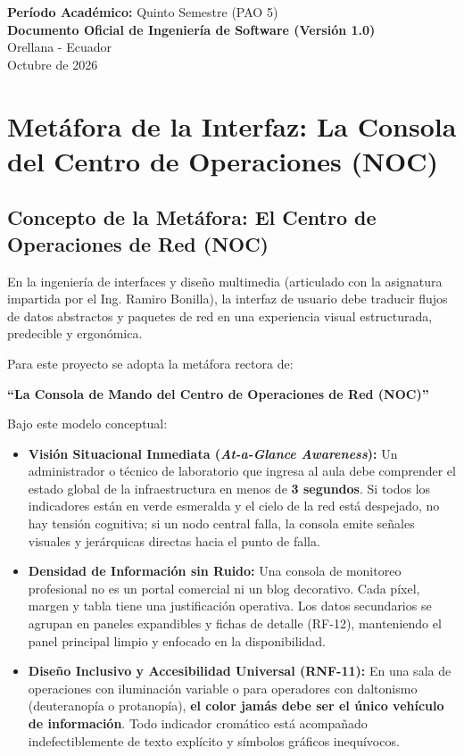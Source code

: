 \documentclass[12pt,a4paper]{report}
\begin{document}
\begin{titlepage}
  \vfill

  {\small\textbf{Período Académico:} Quinto Semestre (PAO 5)}\\[0.05cm]
  {\small\textbf{Documento Oficial de Ingeniería de Software (Versión 1.0)}}\\[0.6cm]

  {\small Orellana - Ecuador}\\[0.15cm]
  {\small Octubre de 2026}
\end{titlepage}

\tableofcontents
\newpage

\listoftables
\newpage

\chapter{Metáfora de la Interfaz: La Consola del Centro de Operaciones (NOC)}

\section{Concepto de la Metáfora: El Centro de Operaciones de Red (NOC)}
En la ingeniería de interfaces y diseño multimedia (articulado con la asignatura impartida por el Ing. Ramiro Bonilla), la interfaz de usuario debe traducir flujos de datos abstractos y paquetes de red en una experiencia visual estructurada, predecible y ergonómica.

Para este proyecto se adopta la metáfora rectora de:
\begin{center}
  \textbf{\large ``La Consola de Mando del Centro de Operaciones de Red (NOC)''}
\end{center}

Bajo este modelo conceptual:
\begin{itemize}
  \item \textbf{Visión Situacional Inmediata (\textit{At-a-Glance Awareness}):} Un administrador o técnico de laboratorio que ingresa al aula debe comprender el estado global de la infraestructura en menos de \textbf{3 segundos}. Si todos los indicadores están en verde esmeralda y el cielo de la red está despejado, no hay tensión cognitiva; si un nodo central falla, la consola emite señales visuales y jerárquicas directas hacia el punto de falla.
  \item \textbf{Densidad de Información sin Ruido:} Una consola de monitoreo profesional no es un portal comercial ni un blog decorativo. Cada píxel, margen y tabla tiene una justificación operativa. Los datos secundarios se agrupan en paneles expandibles y fichas de detalle (RF-12), manteniendo el panel principal limpio y enfocado en la disponibilidad.
  \item \textbf{Diseño Inclusivo y Accesibilidad Universal (RNF-11):} En una sala de operaciones con iluminación variable o para operadores con daltonismo (deuteranopía o protanopía), \textbf{el color jamás debe ser el único vehículo de información}. Todo indicador cromático está acompañado indefectiblemente de texto explícito y símbolos gráficos inequívocos.
\end{itemize}
\end{document}
